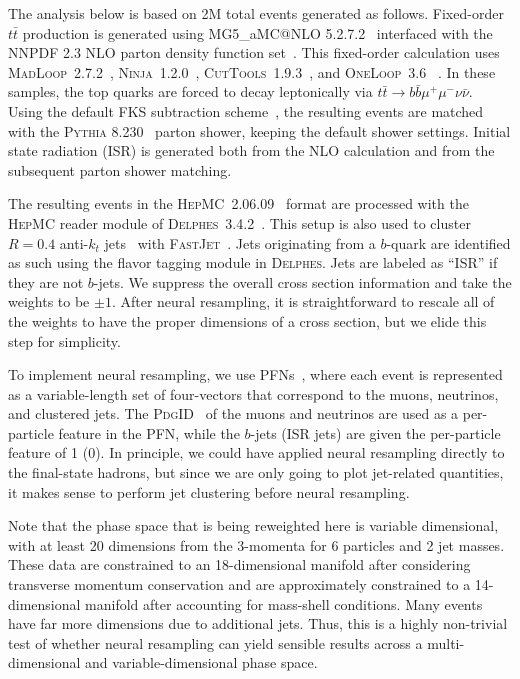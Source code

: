 \documentclass[prd,twocolumn,superscriptaddress,longbibliography,preprintnumbers,floatfix,nofootinbib]{revtex4-1}
\begin{document}
The analysis below is based on 2M total events generated as follows.
%
Fixed-order $t\bar{t}$ production is generated using MG5\_aMC@NLO 5.2.7.2~\cite{Alwall:2014hca} interfaced with the NNPDF 2.3 NLO parton density function set~\cite{Ball:2012cx}.
%
This fixed-order calculation uses \textsc{MadLoop}~2.7.2~\cite{Hirschi:2011pa,Alwall:2014hca}, \textsc{Ninja}~1.2.0~\cite{Mastrolia:2012bu,Peraro:2014cba}, \textsc{CutTools}~1.9.3~\cite{Ossola:2007ax}, and \textsc{OneLoop}~3.6 ~\cite{vanHameren:2010cp,vanHameren:2009dr}.
%
In these samples, the top quarks are forced to decay leptonically via $t\bar{t}\rightarrow b\bar{b}\mu^+\mu^-\nu\bar{\nu}$.
%
Using the default FKS subtraction scheme~\cite{Frixione:1995ms,Frixione:1997np}, the resulting events are matched with the \textsc{Pythia} 8.230~\cite{Sjostrand:2014zea,Sjostrand:2006za} parton shower, keeping the default shower settings.
%
Initial state radiation (ISR) is generated both from the NLO calculation and from the subsequent parton shower matching.





The resulting events in the \textsc{HepMC}~2.06.09~\cite{Dobbs:684090} format are processed with the \textsc{HepMC} reader module of \textsc{Delphes}~3.4.2~\cite{deFavereau:2013fsa}.
%
This setup is also used to cluster $R = 0.4$ anti-$k_t$ jets~\cite{Cacciari:2011ma} with \textsc{FastJet}~\cite{Cacciari:2005hq}.
%
Jets originating from a $b$-quark are identified as such using the flavor tagging module in \textsc{Delphes}.
%
Jets are labeled as ``ISR'' if they are not $b$-jets.
%
We suppress the overall cross section information and take the weights to be $\pm 1$.
%
After neural resampling, it is straightforward to rescale all of the weights to have the proper dimensions of a cross section, but we elide this step for simplicity.  


To implement neural resampling, we use PFNs~\cite{Komiske:2018cqr}, where each event is represented as a variable-length set of four-vectors that correspond to the muons, neutrinos, and clustered jets.
%
The \textsc{PdgID}~\cite{PhysRevD.98.030001} of the muons and neutrinos are used as a per-particle feature in the PFN, while the $b$-jets (ISR jets) are given the per-particle feature of 1 (0).
%
In principle, we could have applied neural resampling directly to the final-state hadrons, but since we are only going to plot jet-related quantities, it makes sense to perform jet clustering before neural resampling.


Note that the phase space that is being reweighted here is variable dimensional, with at least 20 dimensions from the 3-momenta for 6 particles and 2 jet masses.
%
These data are constrained to an 18-dimensional manifold after considering transverse momentum conservation and are approximately constrained to a 14-dimensional manifold after accounting for mass-shell conditions.
%
Many events have far more dimensions due to additional jets.
%
Thus, this is a highly non-trivial test of whether neural resampling can yield sensible results across a multi-dimensional and variable-dimensional phase space.
\end{document}
